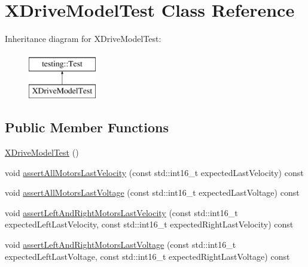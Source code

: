 \hypertarget{classXDriveModelTest}{}\section{X\+Drive\+Model\+Test Class Reference}
\label{classXDriveModelTest}
Inheritance diagram for X\+Drive\+Model\+Test\+:\begin{figure}[H]
\begin{center}
\leavevmode
\includegraphics[height=2.000000cm]{classXDriveModelTest}
\end{center}
\end{figure}
\subsection*{Public Member Functions}
\begin{DoxyCompactItemize}
\item 
\mbox{\hyperlink{classXDriveModelTest_a0d14f77c90990bc3be6aa40e0a08e9fd}{X\+Drive\+Model\+Test}} ()
\item 
void \mbox{\hyperlink{classXDriveModelTest_a7b9d3f3d5b3ca0d4ad3041b3e8920b6a}{assert\+All\+Motors\+Last\+Velocity}} (const std\+::int16\+\_\+t expected\+Last\+Velocity) const
\item 
void \mbox{\hyperlink{classXDriveModelTest_a0e380979e1134286d9e6130281d6c71c}{assert\+All\+Motors\+Last\+Voltage}} (const std\+::int16\+\_\+t expected\+Last\+Voltage) const
\item 
void \mbox{\hyperlink{classXDriveModelTest_a87e74a03685959d1202f0915db5c6a4c}{assert\+Left\+And\+Right\+Motors\+Last\+Velocity}} (const std\+::int16\+\_\+t expected\+Left\+Last\+Velocity, const std\+::int16\+\_\+t expected\+Right\+Last\+Velocity) const
\item 
void \mbox{\hyperlink{classXDriveModelTest_a5730ad7149a9e5f09e38f281ee5e6e3e}{assert\+Left\+And\+Right\+Motors\+Last\+Voltage}} (const std\+::int16\+\_\+t expected\+Left\+Last\+Voltage, const std\+::int16\+\_\+t expected\+Right\+Last\+Voltage) const
\end{DoxyCompactItemize}

